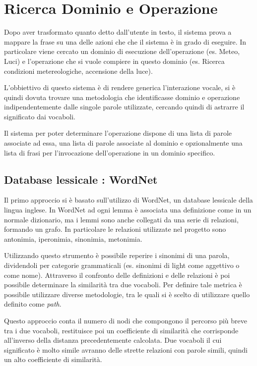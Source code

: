 \documentclass[twoside]{supsistudent}
\begin{document}
\chapter{Ricerca Dominio e Operazione}
Dopo aver trasformato quanto detto dall'utente in testo, il sistema prova a mappare la frase su una delle azioni che che il sistema è in grado di eseguire.
In particolare viene cercato un dominio di esecuzione dell'operazione (es. Meteo, Luci) e l'operazione che si vuole compiere in questo dominio (es. Ricerca condizioni metereologiche, accensione della luce).


L'obbiettivo di questo sistema è di rendere generica l'interazione vocale, si è quindi dovuta trovare una metodologia che identificasse dominio e operazione indipendentemente dalle singole parole utilizzate, cercando quindi di astrarre il significato dai vocaboli.

 Il sistema per poter determinare l'operazione dispone di una lista di parole associate ad essa, una lista di parole associate al dominio e opzionalmente una lista di frasi per l'invocazione dell'operazione in un dominio specifico.

\section{Database lessicale : WordNet}
Il primo approccio si è basato sull'utilizzo di WordNet, un database lessicale della lingua inglese.
In WordNet ad ogni lemma è associata una definizione come in un normale dizionario, ma i lemmi sono anche collegati da una serie di relazioni, formando un grafo. In particolare le relazioni utilizzate nel progetto sono antonimia, iperonimia, sinonimia, metonimia.\cite{wordNet}

Utilizzando questo strumento è possibile reperire i sinonimi di una parola, dividendoli per categorie grammaticali (es. sinonimi di light come aggettivo o come nome).
Attraverso il confronto delle definizioni e delle relazioni è poi possibile determinare la similarità tra due vocaboli. Per definire tale metrica è possibile utilizzare diverse metodologie, tra le quali si è scelto di utilizzare quello definito come \textit{path}. \cite{wordNetWordSimilarity}

Questo approccio conta il numero di nodi che compongono il percorso più breve tra i due vocaboli, restituisce poi un coefficiente di similarità che corrisponde all'inverso della distanza precedentemente calcolata. Due vocaboli il cui significato è molto simile avranno delle strette relazioni con parole simili, quindi un alto coefficiente di similarità.\cite{wordNetPathSimilarity}
\end{document}
